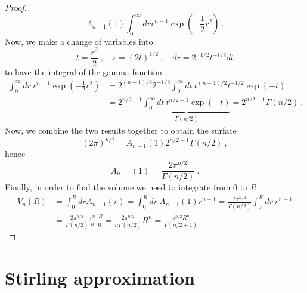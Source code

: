 \begin{proof}
        \begin{equation*}
            A_{n-1} (1) \int_0^\infty dr r^{n-1} \exp(- \frac{1}{2} r^2) ~.
        \end{equation*}
        Now, we make a change of variables into 
        \begin{equation*}
            t = \frac{r^2}{2} ~, \quad r = (2t)^{1/2} ~, \quad dr = 2^{-1/2} t^{-1/2} dt
        \end{equation*}
        to have the integral of the gamma function
        \begin{equation*}
        \begin{aligned}
            \int_0^\infty dr ~ r^{n-1} \exp(- \frac{1}{2} r^2) & = 2^{(n-1)/2} 2^{-1/2}\int_0^\infty dt ~ t^{(n-1)/2} t^{-1/2} \exp(-t) \\ & = 2^{n/2 - 1} \underbrace{\int_0^\infty dt ~ t^{n/2 - 1} \exp(-t)}_{\Gamma(n/2)} = 2^{n/2 - 1} \Gamma(n/2) ~.
        \end{aligned}
        \end{equation*}
        Now, we combine the two results together to obtain the surface
        \begin{equation*}
            (2 \pi)^{n/2} = A_{n-1} (1) 2^{n/2 - 1} \Gamma(n/2) ~,
        \end{equation*}
        hence 
        \begin{equation*}
            A_{n-1} (1) = \frac{2 \pi^{n/2}}{\Gamma(n/2)} ~.
        \end{equation*}
        Finally, in order to find the volume we need to integrate from $0$ to $R$ 
        \begin{equation*}
        \begin{aligned}
            V_n(R) & = \int_0^R dr A_{n-1} (r) = \int_0^R dr ~ A_{n-1} (1) r^{n-1} = \frac{2 \pi^{n/2}}{\Gamma(n/2)} \int_0^R dr ~ r^{n-1} \\ & = \frac{2 \pi^{n/2}}{\Gamma(n/2)} \frac{r^n}{n} \Big \vert_0^R = \frac{2 \pi^{n/2}}{n\Gamma(n/2)} R^n = \frac{\pi^{n/2} R^n}{\Gamma(n/2 + 1)} ~.
        \end{aligned}
        \end{equation*}
    \end{proof}

\chapter{Stirling approximation}


